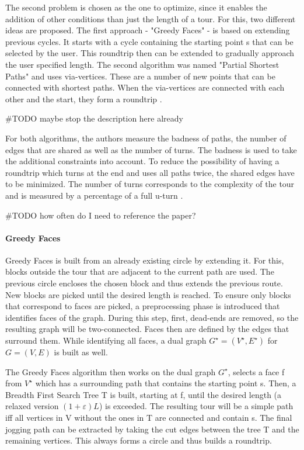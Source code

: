 The second problem is chosen as the one to optimize, since it enables the addition of other conditions than just the length of a tour.
For this, two different ideas are proposed.
The first approach - "Greedy Faces" - is based on extending previous cycles.
It starts with a cycle containing the starting point s that can be selected by the user. 
This roundtrip then can be extended to gradually approach the user specified length. 
The second algorithm was named "Partial Shortest Paths" and uses via-vertices.
These are a number of new points that can be connected with shortest paths.
When the via-vertices are connected with each other and the start, they form a roundtrip \cite{gemsaEfficientComputationJogging2013}.

\#TODO maybe stop the description here already


For both algorithms, the authors measure the badness of paths, the number of edges that are shared as well as the number of turns.
The badness is used to take the additional constraints into account. 
To reduce the possibility of having a roundtrip which turns at the end and uses all paths twice, the shared edges have to be minimized.
The number of turns corresponds to the complexity of the tour and is measured by a percentage of a full u-turn \cite{gemsaEfficientComputationJogging2013}. 

\#TODO how often do I need to reference the paper?


\paragraph{Greedy Faces}

Greedy Faces is built from an already existing circle by extending it.
For this, blocks outside the tour that are adjacent to the current path are used.
The previous circle encloses the chosen block and thus extends the previous route. 
New blocks are picked until the desired length is reached.
To ensure only blocks that correspond to faces are picked, a preprocessing phase is introduced that identifies faces of the graph.
During this step, first, dead-ends are removed, so the resulting graph will be two-connected.
Faces then are defined by the edges that surround them. 
While identifying all faces, a dual graph $G^{\star} = (V^{\star},E^{\star})$ for $G = (V,E)$ is built as well.

The Greedy Faces algorithm then works on the dual graph $G^{\star}$, selects a face f from $V^{\star}$ which has a surrounding path that contains the starting point s. 
Then, a Breadth First Search Tree T is built, starting at f, until the desired length (a relaxed version $(1 + \varepsilon) L$) is exceeded.
The resulting tour will be a simple path iff all vertices in V without the ones in T are connected and contain s.
The final jogging path can be extracted by taking the cut edges between the tree T and the remaining vertices.
This always forms a circle and thus builds a roundtrip.

